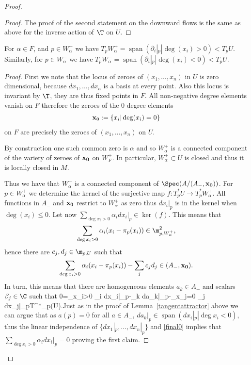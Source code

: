\begin{proof}
\begin{proof}
		The proof of the second statement on the downward flows is  the same as above for the inverse action of $\T$ on $U$.   \end{proof}

	\begin{lemma}
\notready \label{tangentup} For $\alpha\in F$, and $p\in W^+_\alpha$  we have  $T_p W^+_{\alpha}=\operatorname{span}(\partial_i|_p|\deg(x_i)> 0)<T_pU.$ Similarly,  for $p\in W^-_\alpha$  we have  $T_p W^-_{\alpha}=\operatorname{span}(\partial_i|_p|\deg(x_i)< 0)<T_pU.$
	\end{lemma}

	\begin{proof} First we note that the locus of zeroes of $(x_1,\dots,x_n)$ in $U$ is zero dimensional, because $dx_1,\dots,dx_n$ is a basis at every point. Also this locus is invariant by $\T$, they are thus fixed points in $F$. All non-negative degree elements vanish on $F$ therefore the zeroes of the $0$ degree elements $${\bf x}_0:=\{x_i|\deg(x_i)=0\}$$ on $F$ are precisely the zeroes of $(x_1,\dots,x_n)$ on $U$.

		By construction one such common zero is $\alpha$ and so $W^+_\alpha$ is a connected component of the variety of zeroes of $\bf{x}_0$ on $W^+_{F}$. In particular, $W^+_\alpha\subset U$ is closed and thus it is locally closed in $M$.

		Thus we have that  $W^+_\alpha$ is a connected component of $\Spec(A/(A_-,\bf{x}_0))$. For $p\in W^+_\alpha$ we determine the kernel of the surjective map $f:T^*_p U\to T^*_p W^+_\alpha$. All functions in $A_-$ and  $\bf{x}_0$ restrict to $W^+_\alpha$ as zero thus $dx_i|_p$ is in the kernel when $\deg(x_i)\leq 0$. Let now $\sum_{\deg x_i>0} \alpha_i dx_i|_p \in \ker(f)$. This means that $$\sum_{\deg x_i> 0} \alpha_i (x_i-\pi_p(x_i))\in \m_{p,W^+_\alpha }^2,$$ hence there are $c_j,d_j\in \m_{p,U}$ such that $$\sum_{\deg x_i> 0} \alpha_i (x_i-\pi_p(x_i))-\sum_j c_j d_j\in (A_-,\bf{x}_0).$$ In turn, this means that there are homogeneous elements $a_k\in A_-$  and scalars $\beta_j\in \C$ such that \beq \label{final0} 0=\sum_{\deg x_i>0} \alpha_i dx_i|_p-\sum_k  da_k|_p-\sum_{\deg x_j=0} \beta_j dx_j|_p\in  T^*_p(U).\eeq Just as in the proof of Lemma~\ref{tangentattractor} above we can argue that as $a(p)=0$ for all $a\in A_-$, $da_k|_p\in \operatorname{span}(dx_i|_p|\deg x_i<0)$, thus the linear independence of $\{dx_1|_p,\dots,dx_n|_p\}$ and \eqref{final0} implies that $\sum_{\deg x_i>0} \alpha_i dx_i|_p =0$ proving the first claim.


\end{proof}
\end{proof}
